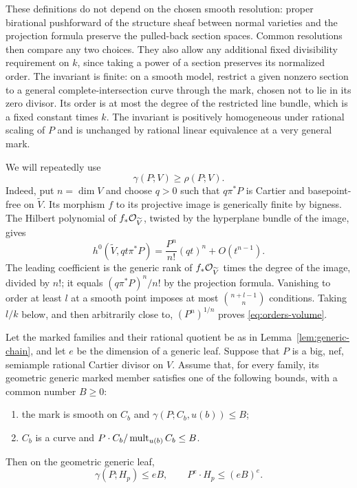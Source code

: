 These definitions do not depend on the chosen smooth resolution: proper
birational pushforward of the structure sheaf between normal varieties
and the projection formula preserve the pulled-back section spaces.
Common resolutions then compare any two choices.  They also allow any
additional fixed divisibility requirement on $k$, since taking a power of
a section preserves its normalized order.  The invariant is finite:
on a smooth model, restrict a given nonzero section to a general
complete-intersection curve through the mark, chosen not to lie in its
zero divisor.  Its order is at most the degree of the restricted line
bundle, which is a fixed constant times $k$.  The invariant is positively
homogeneous under rational scaling of $P$ and is unchanged by rational
linear equivalence at a very general mark.

We will repeatedly use
\begin{equation}\label{eq:orders-volume}
 \gamma(P;V)\ge \rho(P;V).
\end{equation}
Indeed, put $n=\dim V$ and choose $q>0$ such that $q\pi^*P$ is Cartier
and basepoint-free on $\widetilde V$. Its morphism $f$ to its projective
image is generically finite by bigness. The Hilbert polynomial of
$f_*\mathcal O_{\widetilde V}$, twisted by the hyperplane bundle of the image,
gives
\[
 h^0(\widetilde V,qt\pi^*P)
   =\frac{P^n}{n!}(qt)^n+O(t^{n-1}).
\]
The leading coefficient is the generic rank of
$f_*\mathcal O_{\widetilde V}$ times the degree of the image, divided by $n!$;
it equals $(q\pi^*P)^n/n!$ by the projection formula.
Vanishing to order at least $l$ at a smooth point imposes at most
$\binom{n+l-1}{n}$ conditions.  Taking $l/k$ below, and then arbitrarily
close to, $(P^n)^{1/n}$ proves \eqref{eq:orders-volume}.

\begin{lemma}\label{lem:chain-order}
Let the marked families and their rational quotient be as in
Lemma~\ref{lem:generic-chain}, and let $e$ be the dimension of a generic
leaf. Suppose that $P$ is a big, nef, semiample rational Cartier
divisor on $V$.  Assume that, for every family, its geometric generic
marked member satisfies one of the following bounds, with a common
number $B\ge0$:
\begin{enumerate}[label=\textup{(\roman*)}]
 \item the mark is smooth on $C_b$ and
       $\gamma(P;C_b,u(b))\le B$;
 \item $C_b$ is a curve and
       $P\cdot C_b/\operatorname{mult}_{u(b)}C_b\le B$.
\end{enumerate}
Then on the geometric generic leaf,
\begin{equation}\label{eq:chain-order-degree}
 \gamma(P;H_p)\le eB,
 \qquad
 P^e\cdot H_p\le(eB)^e.
\end{equation}
\end{lemma}

